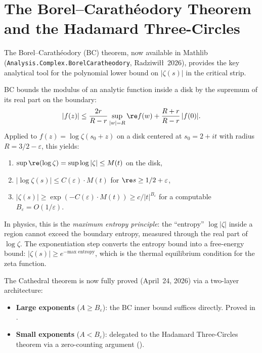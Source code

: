 \section{The Borel--Carath\'eodory Theorem and the Hadamard Three-Circles}
\label{sec:bc}

The Borel--Carath\'eodory (BC) theorem, now available in Mathlib
(\texttt{Analysis.Complex.BorelCaratheodory}, Radziwi{\l}{\l}\ 2026),
provides the key analytical tool for the polynomial lower bound on
$|\zeta(s)|$ in the critical strip.

\begin{principle}
BC bounds the modulus of an analytic function inside a disk by the
supremum of its real part on the boundary:
\[
  |f(z)| \leq \frac{2r}{R - r}\sup_{|w| = R} \re f(w)
  + \frac{R + r}{R - r}\,|f(0)|.
\]
Applied to $f(z) = \log\zeta(s_0 + z)$ on a disk centered at $s_0 = 2 + it$
with radius $R = 3/2 - \varepsilon$, this yields:
\begin{enumerate}
  \item $\sup \re(\log\zeta) = \sup \log|\zeta| \leq M(t)$ on the disk,
  \item $|\log\zeta(s)| \leq C(\varepsilon) \cdot M(t)$ for
    $\re s \geq 1/2 + \varepsilon$,
  \item $|\zeta(s)| \geq \exp(-C(\varepsilon) \cdot M(t))
    \geq c/|t|^{B_\varepsilon}$ for a computable $B_\varepsilon = O(1/\varepsilon)$.
\end{enumerate}

In physics, this is the \emph{maximum entropy principle}: the
``entropy'' $\log|\zeta|$ inside a region cannot exceed the
boundary entropy, measured through the real part of $\log\zeta$.
The exponentiation step converts the entropy bound into a
free-energy bound: $|\zeta(s)| \geq e^{-\text{max entropy}}$,
which is the thermal equilibrium condition for the zeta function.

The Cathedral theorem  is now
fully proved (April~24, 2026) via a two-layer architecture:
\begin{itemize}
  \item \textbf{Large exponents} ($A \geq B_\varepsilon$): the BC inner bound
    suffices directly. Proved in .
  \item \textbf{Small exponents} ($A < B_\varepsilon$): delegated to the
    Hadamard Three-Circles theorem via a zero-counting argument
    ().
\end{itemize}
\end{principle}

